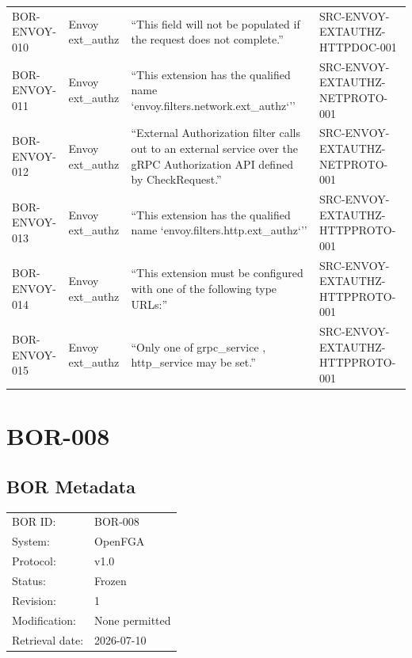 \documentclass{article}
\begin{document}
\begin{longtable}{@{}p{}p{}p{}p{}@{}}
BOR-ENVOY-010 & Envoy ext\_authz & ``This field will not be populated if the request does not complete.'' & SRC-ENVOY-EXTAUTHZ-HTTPDOC-001\\
BOR-ENVOY-011 & Envoy ext\_authz & ``This extension has the qualified name `envoy.filters.network.ext\_authz`'' & SRC-ENVOY-EXTAUTHZ-NETPROTO-001\\
BOR-ENVOY-012 & Envoy ext\_authz & ``External Authorization filter calls out to an external service over the gRPC Authorization API defined by CheckRequest.'' & SRC-ENVOY-EXTAUTHZ-NETPROTO-001\\
BOR-ENVOY-013 & Envoy ext\_authz & ``This extension has the qualified name `envoy.filters.http.ext\_authz`'' & SRC-ENVOY-EXTAUTHZ-HTTPPROTO-001\\
BOR-ENVOY-014 & Envoy ext\_authz & ``This extension must be configured with one of the following type URLs:'' & SRC-ENVOY-EXTAUTHZ-HTTPPROTO-001\\
BOR-ENVOY-015 & Envoy ext\_authz & ``Only one of grpc\_service , http\_service may be set.'' & SRC-ENVOY-EXTAUTHZ-HTTPPROTO-001\\
\bottomrule
\end{longtable}

\newpage
\section*{BOR-008}

\subsection*{BOR Metadata}
\begin{tabular}{@{}ll@{}}
\toprule
BOR ID: & BOR-008\\
System: & OpenFGA\\
Protocol: & v1.0\\
Status: & Frozen\\
Revision: & 1\\
Modification: & None permitted\\
Retrieval date: & 2026-07-10\\
\bottomrule
\end{tabular}
\end{document}

